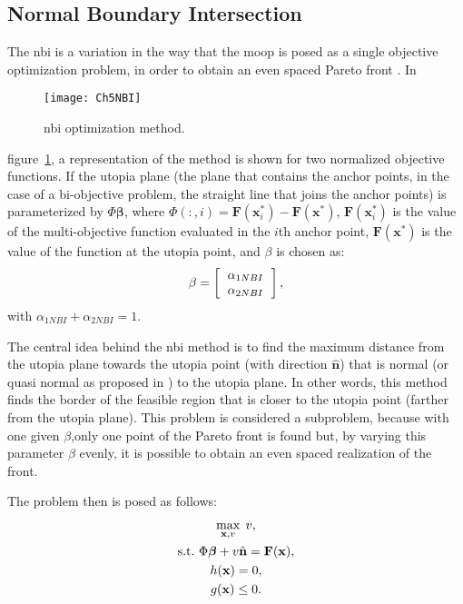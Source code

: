 \subsection{Normal Boundary Intersection}
\label{sec:NBI}
%
The \gls{nbi} is a variation in the way that the \gls{moop} is posed as a single objective optimization problem, in order to obtain an even spaced Pareto front \cite{Das1998}. In %
%
\begin{figure}[b]%
	\centering
	\texttt{[image: Ch5NBI]}%
	\caption{\gls{nbi} optimization method.}%
	\label{fig:NBI}%
\end{figure}
%
figure~\ref{fig:NBI}, a representation of the method is shown for two normalized objective functions. If the utopia plane (the plane that contains the anchor points, in the case of a bi-objective problem, the straight line that joins the anchor points) is parameterized by $\Phi\mathbf{\beta}$, where $\Phi(:,i)=\mathbf{F}(\mathbf{x}_i^*)-\mathbf{F}(\mathbf{x}^*)$, $\mathbf{F}(\mathbf{x}_i^*)$ is the value of the multi-objective function evaluated in the $i$th anchor point, $\mathbf{F}(\mathbf{x}^*)$ is the value of the function at the utopia point, and $\beta$ is chosen as:
\begin{equation}
\beta=
\left[\begin{tabular}{c}
$\alpha_{1NBI}$ \\ $\alpha_{2NBI}$
\end{tabular}\right],
\label{eq:Beta}
\end{equation}
with $\alpha_{1NBI}+\alpha_{2NBI}=1$.

The central idea behind the \gls{nbi} method is to find the maximum distance from the utopia plane towards the utopia point (with direction $\hat{\mathbf{n}}$) that is normal (or quasi normal as proposed in \cite{Das1998}) to the utopia plane. In other words, this method finds the border of the feasible region that is closer to the utopia point (farther from the utopia plane). This problem is considered a subproblem, because with one given $\beta$,only one point of the Pareto front is found but, by varying this parameter $\beta$ evenly, it is possible to obtain an even spaced realization of the front.

The problem then is posed as follows:%
%
\begin{equation}
\begin{gathered}
\max_{\mathbf{x},v}{\;v}, \\
\text{s.t.} \ \Phi \boldsymbol{\beta} + v \hat{\mathbf{n}} = \mathbf{F}(\mathbf{x}),\\
h(\mathbf{x})=0, \\
g(\mathbf{x}) \leq 0.
\end{gathered}
\label{eq:NBIProblem}
\end{equation}%

